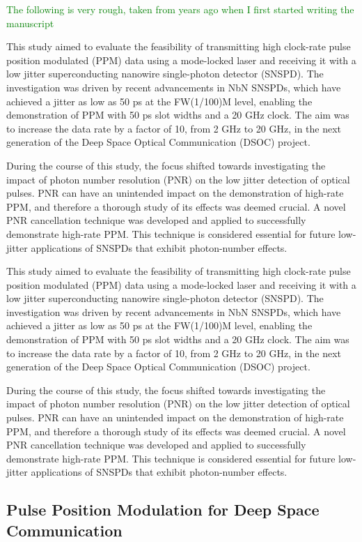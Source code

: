 \documentclass{optica-article}
\begin{document}
\textcolor{green}{ The following is very rough, taken from years ago when I first started writing the manuscript }

This study aimed to evaluate the feasibility of transmitting high clock-rate pulse position modulated (PPM) data using a mode-locked laser and receiving it with a low jitter superconducting nanowire single-photon detector (SNSPD). The investigation was driven by recent advancements in NbN SNSPDs, which have achieved a jitter as low as 50 ps at the FW(1/100)M level, enabling the demonstration of PPM with 50 ps slot widths and a 20 GHz clock. The aim was to increase the data rate by a factor of 10, from 2 GHz to 20 GHz, in the next generation of the Deep Space Optical Communication (DSOC) project.

During the course of this study, the focus shifted towards investigating the impact of photon number resolution (PNR) on the low jitter detection of optical pulses. PNR can have an unintended impact on the demonstration of high-rate PPM, and therefore a thorough study of its effects was deemed crucial. A novel PNR cancellation technique was developed and applied to successfully demonstrate high-rate PPM. This technique is considered essential for future low-jitter applications of SNSPDs that exhibit photon-number effects.

This study aimed to evaluate the feasibility of transmitting high clock-rate pulse position modulated (PPM) data using a mode-locked laser and receiving it with a low jitter superconducting nanowire single-photon detector (SNSPD). The investigation was driven by recent advancements in NbN SNSPDs, which have achieved a jitter as low as 50 ps at the FW(1/100)M level, enabling the demonstration of PPM with 50 ps slot widths and a 20 GHz clock. The aim was to increase the data rate by a factor of 10, from 2 GHz to 20 GHz, in the next generation of the Deep Space Optical Communication (DSOC) project.

During the course of this study, the focus shifted towards investigating the impact of photon number resolution (PNR) on the low jitter detection of optical pulses. PNR can have an unintended impact on the demonstration of high-rate PPM, and therefore a thorough study of its effects was deemed crucial. A novel PNR cancellation technique was developed and applied to successfully demonstrate high-rate PPM. This technique is considered essential for future low-jitter applications of SNSPDs that exhibit photon-number effects.

\hypertarget{pulse-position-modulation-for-deep-space-communication}{%
\subsection{Pulse Position Modulation for Deep Space Communication}\label{pulse-position-modulation-for-deep-space-communication}}
\end{document}
